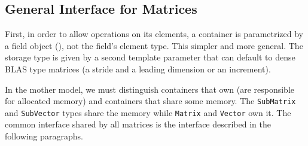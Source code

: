 \subsection{General Interface for %
Matrices}
%
First, in order to allow operations on its elements, a container is
parametrized by a field object (\cf {}), not the field's element type. This simpler and
more general.  The storage type is given by a second template parameter
that can default to \eg dense BLAS type matrices (a stride and a leading
dimension or an increment).  %
%

%
In the mother model, we must distinguish containers that own (are responsible for allocated memory) and containers that share some
memory.  The \texttt{SubMatrix} and \texttt{SubVector} types share the memory
while \texttt{Matrix} and \texttt{Vector} own it.
%
The common interface shared by all matrices is the \applin  interface described
in the following paragraphs.
%
% 
%
